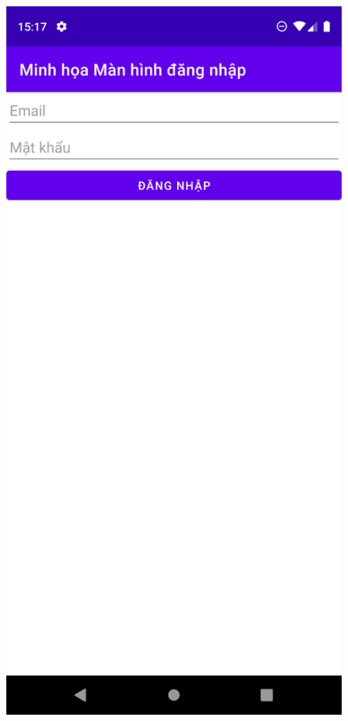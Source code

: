 \documentclass{beamer}
\begin{document}
\begin{frame}
    \begin{columns}
        \begin{figure}
            \centering
            \includegraphics[height=0.7\textheight]{images/24.png}

\end{figure}
\end{columns}
\end{frame}
\end{document}
